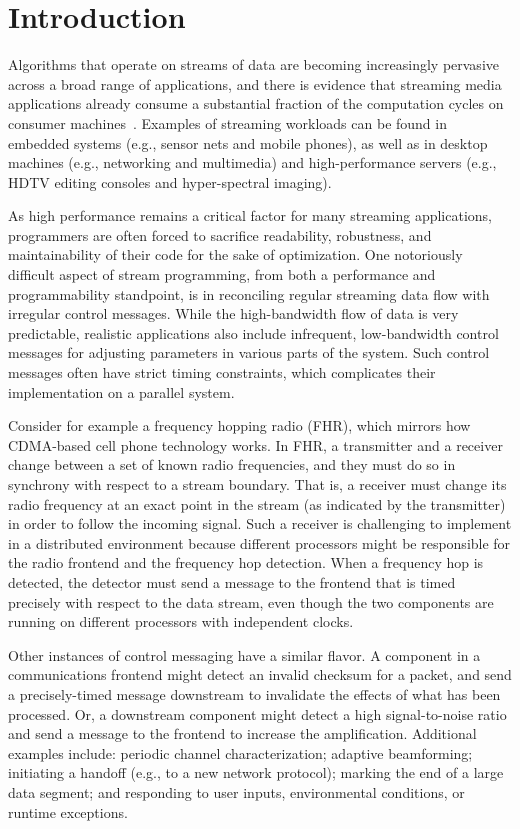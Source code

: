 \section{Introduction}

Algorithms that operate on streams of data are becoming increasingly
pervasive across a broad range of applications, and there is evidence
that streaming media applications already consume a substantial
fraction of the computation cycles on consumer
machines~\cite{kirkpatrick97,Rix98,dief97,conte97}.  Examples of
streaming workloads can be found in embedded systems (e.g., sensor
nets and mobile phones), as well as in desktop machines (e.g.,
networking and multimedia) and high-performance servers (e.g., HDTV
editing consoles and hyper-spectral imaging).

As high performance remains a critical factor for many streaming
applications, programmers are often forced to sacrifice readability,
robustness, and maintainability of their code for the sake of
optimization.  One notoriously difficult aspect of stream programming,
from both a performance and programmability standpoint, is in
reconciling regular streaming data flow with irregular control
messages.  While the high-bandwidth flow of data is very predictable,
realistic applications also include infrequent, low-bandwidth control
messages for adjusting parameters in various parts of the system.
Such control messages often have strict timing constraints, which
complicates their implementation on a parallel system.

Consider for example a frequency hopping radio (FHR), which mirrors
how CDMA-based cell phone technology works.  In FHR, a transmitter and
a receiver change between a set of known radio frequencies, and they
must do so in synchrony with respect to a stream boundary. That is, a
receiver must change its radio frequency at an exact point in the
stream (as indicated by the transmitter) in order to follow the
incoming signal.  Such a receiver is challenging to implement in a
distributed environment because different processors might be
responsible for the radio frontend and the frequency hop detection.
When a frequency hop is detected, the detector must send a message to
the frontend that is timed precisely with respect to the data stream,
even though the two components are running on different processors
with independent clocks.

Other instances of control messaging have a similar flavor.  A
component in a communications frontend might detect an invalid
checksum for a packet, and send a precisely-timed message downstream
to invalidate the effects of what has been processed.  Or, a
downstream component might detect a high signal-to-noise ratio and
send a message to the frontend to increase the amplification.
Additional examples include: periodic channel characterization;
adaptive beamforming; initiating a handoff (e.g., to a new
network protocol); marking the end of a large data segment; and
responding to user inputs, environmental conditions, or runtime
exceptions.

